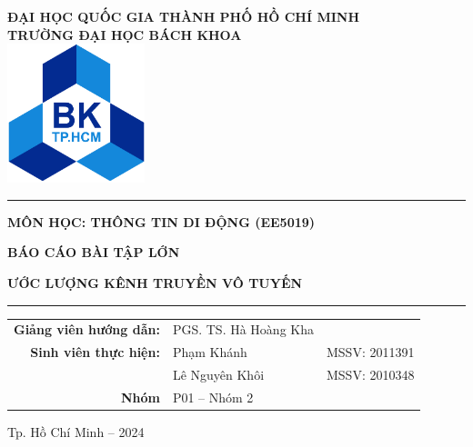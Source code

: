 \begin{titlepage}
    
    \begin{center}
    	\textbf{ĐẠI HỌC QUỐC GIA THÀNH PHỐ HỒ CHÍ MINH}\\[3pt]
    	\textbf{TRƯỜNG ĐẠI HỌC BÁCH KHOA}\\ 
    	
    	\vspace{1.5cm}
    	\includegraphics[width=4cm]{../images/logo_BK.png}
    	\vspace{0.5cm}
    \end{center}
    
    \begin{center}
        \setlength{\parskip}{.5em}
        \par\noindent\rule{0.8\textwidth}{0.4pt}

        \textbf{{MÔN HỌC: THÔNG TIN DI ĐỘNG (EE5019)}}
        
        \textbf{{\large BÁO CÁO BÀI TẬP LỚN}}
    	    
        \textbf{{ƯỚC LƯỢNG KÊNH TRUYỀN VÔ TUYẾN}}
        \par\noindent\rule{0.8\textwidth}{0.4pt}
    \end{center}
    
    \vspace{1em}
    \begin{center}
        \renewcommand{\arraystretch}{1.5}
        \begin{tabular}{R{0.35} L{0.3} L{0.25}}
            \textbf{Giảng viên hướng dẫn:} & PGS. TS. Hà Hoàng Kha\\
            \textbf{Sinh viên thực hiện:} & Phạm Khánh & MSSV: 2011391\\
            & Lê Nguyên Khôi & MSSV: 2010348     \\
            \textbf{Nhóm} & P01 -- Nhóm 2 & 
        \end{tabular}
    \end{center}
    
    \vfill
    \begin{center}
        Tp. Hồ Chí Minh -- 2024
    \end{center}
    \vspace{1em}
\end{titlepage}
